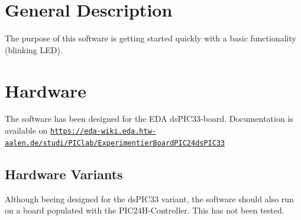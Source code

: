\hypertarget{index_genDescr_sec}{}\section{General Description}\label{index_genDescr_sec}
The purpose of this software is getting started quickly with a basic functionality (blinking L\+ED).\hypertarget{index_hardware_sec}{}\section{Hardware}\label{index_hardware_sec}
The software has been designed for the E\+DA ds\+P\+I\+C33-\/board. Documentation is available on \href{https://eda-wiki.eda.htw-aalen.de/studi/PIClab/ExperimentierBoardPIC24dsPIC33}{\tt https\+://eda-\/wiki.\+eda.\+htw-\/aalen.\+de/studi/\+P\+I\+Clab/\+Experimentier\+Board\+P\+I\+C24ds\+P\+I\+C33}\hypertarget{index_hwSub_sec}{}\subsection{Hardware Variants}\label{index_hwSub_sec}
Although beeing designed for the ds\+P\+I\+C33 variant, the software should also run on a board populated with the P\+I\+C24\+H-\/\+Controller. This has not been tested. 